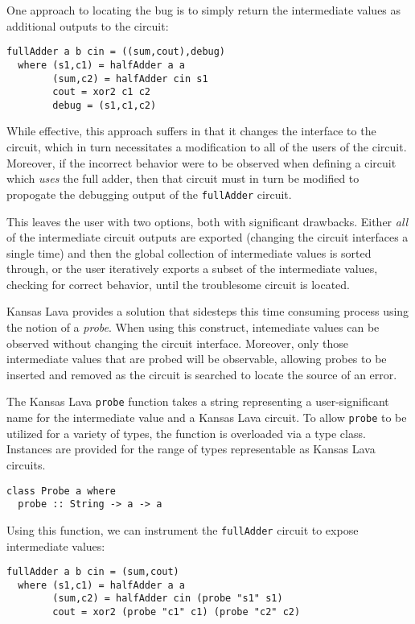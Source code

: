\documentclass{llncs}
\begin{document}
One approach to locating the bug is to simply return the intermediate values as
additional outputs to the circuit:

\begin{verbatim}
fullAdder a b cin = ((sum,cout),debug)
  where (s1,c1) = halfAdder a a
        (sum,c2) = halfAdder cin s1
        cout = xor2 c1 c2
        debug = (s1,c1,c2)
\end{verbatim}

While effective, this approach suffers in that it changes the interface to the
circuit, which in turn necessitates a modification to all of the users of the
circuit. Moreover, if the incorrect behavior were to be observed when defining a
circuit which \emph{uses} the full adder, then that circuit must in turn be
modified to propogate the debugging output of the \verb!fullAdder! circuit.

This leaves the user with two options, both with
significant drawbacks. Either \emph{all} of the intermediate circuit outputs are
exported (changing the circuit interfaces a single time) and then the global
collection of intermediate values is sorted through, or the user 
iteratively exports a subset of the intermediate values, checking for correct
behavior, until the troublesome circuit is located.

Kansas Lava provides a solution that sidesteps this time consuming process
using the notion of a \emph{probe}. When using this construct,
intemediate values can be observed without changing the circuit
interface. Moreover, only those intermediate values that are probed will be
observable, allowing probes to be inserted and removed as the circuit is
searched to locate the source of an error.

The Kansas Lava \verb!probe! function takes a string representing a
user-significant name for the intermediate value and a Kansas Lava
circuit. To allow \verb!probe! to be utilized for a variety of types, the
function is overloaded via a type class. Instances are provided for the range of
types representable as Kansas Lava circuits.

\begin{verbatim}
class Probe a where
  probe :: String -> a -> a
\end{verbatim}

Using this function, we can instrument the \verb!fullAdder! circuit to expose
intermediate values:

\begin{verbatim}
fullAdder a b cin = (sum,cout)
  where (s1,c1) = halfAdder a a
        (sum,c2) = halfAdder cin (probe "s1" s1)
        cout = xor2 (probe "c1" c1) (probe "c2" c2)
\end{verbatim}
\end{document}
